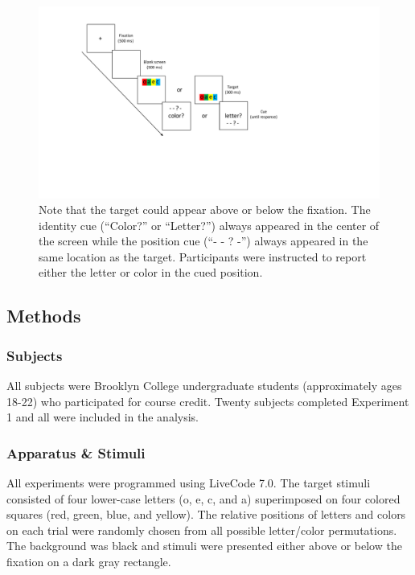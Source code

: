 \documentclass[english,,man,floatsintext]{apa6}
\begin{document}
\begin{figure}
\centering
\includegraphics{figures/IC-figure1.pdf}
\caption{\label{fig:figure1}Note that the target could appear above or below the
fixation. The identity cue (\enquote{Color?} or \enquote{Letter?})
always appeared in the center of the screen while the position cue
(\enquote{- - ? -}) always appeared in the same location as the target.
Participants were instructed to report either the letter or color in the
cued position.}
\end{figure}








\subsection{Methods}\label{methods}

\subsubsection{Subjects}\label{subjects}

All subjects were Brooklyn College undergraduate students (approximately
ages 18-22) who participated for course credit. Twenty subjects
completed Experiment 1 and all were included in the analysis.

\subsubsection{Apparatus \& Stimuli}\label{apparatus-stimuli}

All experiments were programmed using LiveCode 7.0. The target stimuli
consisted of four lower-case letters (o, e, c, and a) superimposed on
four colored squares (red, green, blue, and yellow). The relative
positions of letters and colors on each trial were randomly chosen from
all possible letter/color permutations. The background was black and
stimuli were presented either above or below the fixation on a dark gray
rectangle.
\end{document}
